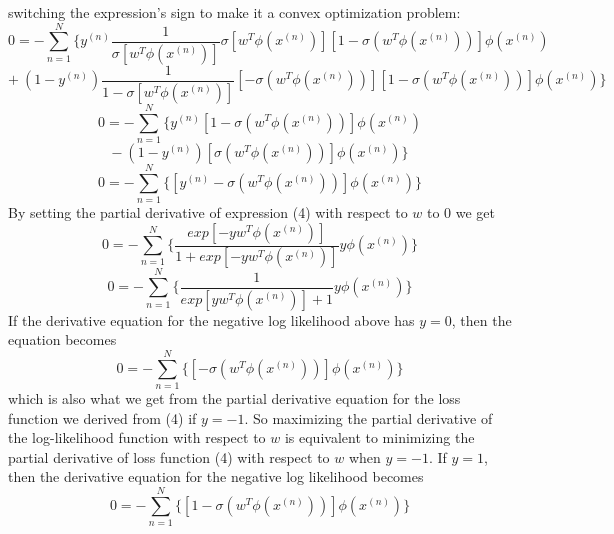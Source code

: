 \documentclass[12 pt]{article}        	%
\begin{document}
switching the expression's sign to make it a convex optimization problem:
\begin{displaymath}
  0 = - \sum_{n=1}^{N} \{ 
  y^{(n)} 
  \frac{1}{\sigma [w^T \phi(x^{(n)})]} \sigma [w^T \phi(x^{(n)})] 
  [1 - \sigma (w^T \phi(x^{(n)}))] 
  \phi(x^{(n)})
\end{displaymath}
\begin{displaymath}
  + \: (1 - y^{(n)})
  \frac{1} {1 - \sigma [w^T \phi (x^{(n)})]}
  [- \sigma (w^T \phi(x^{(n)}))]
  [1 - \sigma (w^T \phi(x^{(n)}))]
  \phi(x^{(n)})
  \}
\end{displaymath}
\begin{displaymath}
  0 = - \sum_{n=1}^{N} \{ 
    y^{(n)} [1 - \sigma (w^T \phi(x^{(n)}))] 
  \phi(x^{(n)})
\end{displaymath}
\begin{displaymath}
  - \: (1 - y^{(n)})
  [ \sigma (w^T \phi(x^{(n)}))]
  \phi(x^{(n)})
  \}
\end{displaymath}
\begin{displaymath}
  0 = - \sum_{n=1}^{N} \{
    [ y^{(n)} - \sigma (w^T \phi(x^{(n)})) ] \phi(x^{(n)})
  \}
\end{displaymath}
By setting the partial derivative of expression (4) with respect to $ w $ to 0 we get
\begin{displaymath}
  0 = - \sum_{n=1}^N{} \{
    \frac{exp [ -yw^T \phi(x^{(n)}) ]} {1 + exp[-yw^T \phi(x^{(n)})]} y \phi(x^{(n)})
  \}
\end{displaymath}
\begin{displaymath}
0 = - \sum_{n=1}^N{} \{
  \frac{1} {exp[yw^T \phi(x^{(n)})] + 1} y \phi(x^{(n)})
  \}
\end{displaymath}
If the derivative equation for the negative log likelihood above has $ y = 0 $, 
then the equation becomes
\begin{displaymath}
  0 = - \sum_{n=1}^{N} \{
    [ - \sigma (w^T \phi(x^{(n)})) ] \phi(x^{(n)})
  \}
\end{displaymath}
which is also what we get from the partial derivative equation for the loss function we derived from (4) 
if $ y = -1 $. So maximizing the partial derivative of the log-likelihood function with respect to $ w $ 
is equivalent to minimizing the partial derivative of loss function (4) with respect to $ w $
when $ y = -1 $. If $ y = 1 $, then the derivative equation for the negative log likelihood becomes
\begin{displaymath}
  0 = - \sum_{n=1}^{N} \{
    [ 1 - \sigma (w^T \phi(x^{(n)})) ] \phi(x^{(n)})
  \}
\end{displaymath}
\end{document}
